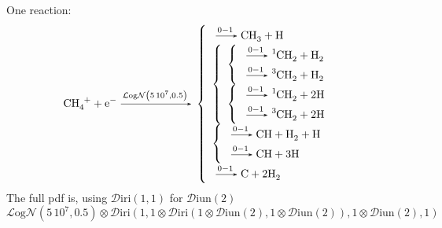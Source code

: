 \documentclass{article}
\newcommand{\dirichlet}[2]{\ensuremath{\mathcal{D}\text{#2}\left(#1\right)}}
\newcommand{\Diri}[1]{\dirichlet{#1}{iri}}
\newcommand{\Diun}[1]{\dirichlet{#1}{iun}}
\newcommand{\LogN}[1]{\ensuremath{\mathcal{L}\text{og}\mathcal{N}\left(#1\right)}}
\begin{document}
One reaction:
\begin{displaymath}
\renewcommand{\arraystretch}{1.5}
\ce{CH4+ + e- ->[\LogN{5\,10^{7},0.5}]}\left\{\begin{array}{l}
                        \ce{->[0-1] CH3 + H} \\
                        \left\{\begin{array}{l}
                               \left\{\begin{array}{l}
                                      \ce{->[0-1] ^1CH2 + H2} \\
                                      \ce{->[0-1] ^3CH2 + H2} \\
                                      \end{array}\right.\\
                               \left\{\begin{array}{l}
                                      \ce{->[0-1] ^1CH2 + 2 H} \\
                                      \ce{->[0-1] ^3CH2 + 2 H} \\
                                      \end{array}\right.
                               \end{array}\right. \\
                        \left\{\begin{array}{l}
                                \ce{->[0-1] CH + H2 + H} \\
                                \ce{->[0-1] CH + 3 H} \\
                               \end{array}\right. \\
                        \ce{->[0-1] C + 2 H2}
                        \end{array}\right.
\end{displaymath}
The full pdf is, using \Diri{1,1} for \Diun{2}
\[
\LogN{5\,10^7,0.5} \otimes \Diri{1,1\otimes\Diri{1\otimes\Diun{2},1\otimes\Diun{2}},1\otimes\Diun{2},1}
\]
\end{document}
